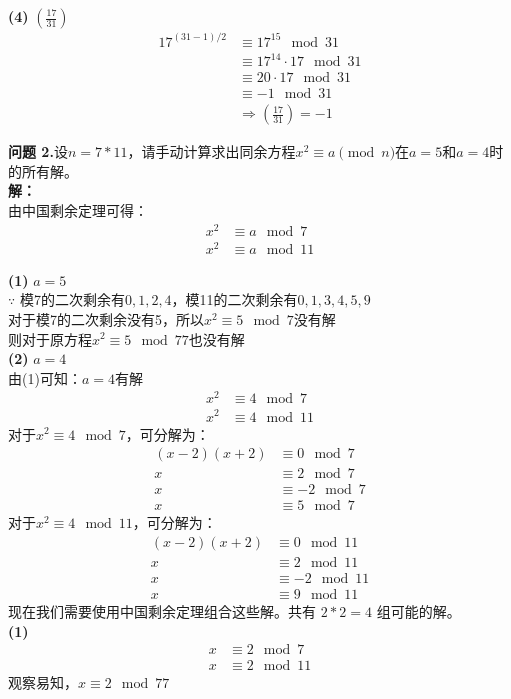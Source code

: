 \documentclass[a4paper]{CINTA}
\begin{document}
\textbf{(4)} $(\frac{17}{31})$\\
\begin{align*}
    17^{(31-1)/2} &\equiv 17^{15} \mod 31\\
    &\equiv 17^{14} \cdot 17 \mod 31\\
    &\equiv 20 \cdot 17 \mod 31\\
    &\equiv -1 \mod 31\\
    &\Rightarrow (\frac{17}{31}) = -1
\end{align*}

\textbf{问题 2.}设$n= 7*11$，请手动计算求出同余方程$x^2 \equiv a \pmod{n}$在$a = 5$和$a = 4$时的所有解。\\
\textbf{解：}\\
由中国剩余定理可得：\\
\begin{align*}
    x^2 &\equiv a \mod 7\\
    x^2 &\equiv a \mod 11
\end{align*}

\textbf{(1)} $a = 5$\\
$\because$ 模7的二次剩余有$0,1,2,4$，模11的二次剩余有$0,1,3,4,5,9$\\
对于模7的二次剩余没有5，所以$x^2 \equiv 5 \mod 7$没有解\\
则对于原方程$x^2 \equiv 5 \mod 77$也没有解\\

\textbf{(2)} $a = 4$\\
由(1)可知：$a = 4$有解\\
\begin{align*}
    x^2 &\equiv 4 \mod 7\\
    x^2 &\equiv 4 \mod 11
\end{align*}
对于$x^2 \equiv 4 \mod 7$，可分解为：\\
\begin{align*}
    (x-2)(x+2) &\equiv 0 \mod 7\\
    x &\equiv 2 \mod 7\\
    x &\equiv -2 \mod 7\\
    x &\equiv 5 \mod 7
\end{align*}
对于$x^2 \equiv 4 \mod 11$，可分解为：\\
\begin{align*}
    (x-2)(x+2) &\equiv 0 \mod 11\\
    x &\equiv 2 \mod 11\\
    x &\equiv -2 \mod 11\\
    x &\equiv 9 \mod 11
\end{align*}
现在我们需要使用中国剩余定理组合这些解。共有 $2 * 2=4$ 组可能的解。\\
\textbf{(1)}\\
\begin{align*}
    x &\equiv 2 \mod 7\\
    x &\equiv 2 \mod 11
\end{align*}
观察易知，$x \equiv 2 \mod 77$\\
\end{document}
